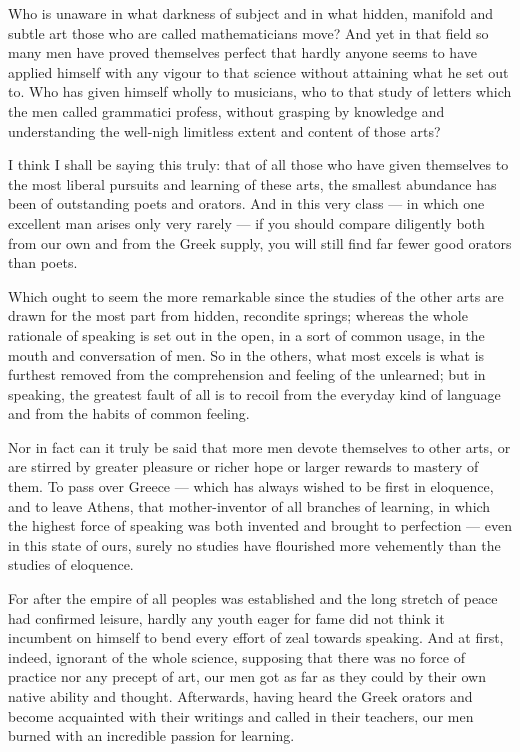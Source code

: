  Who is unaware in what darkness of subject and in what hidden, manifold and subtle art those who are called mathematicians move? And yet in that field so many men have proved themselves perfect that hardly anyone seems to have applied himself with any vigour to that science without attaining what he set out to. Who has given himself wholly to musicians, who to that study of letters which the men called grammatici profess, without grasping by knowledge and understanding the well-nigh limitless extent and content of those arts?

 I think I shall be saying this truly: that of all those who have given themselves to the most liberal pursuits and learning of these arts, the smallest abundance has been of outstanding poets and orators. And in this very class — in which one excellent man arises only very rarely — if you should compare diligently both from our own and from the Greek supply, you will still find far fewer good orators than poets.

 Which ought to seem the more remarkable since the studies of the other arts are drawn for the most part from hidden, recondite springs; whereas the whole rationale of speaking is set out in the open, in a sort of common usage, in the mouth and conversation of men. So in the others, what most excels is what is furthest removed from the comprehension and feeling of the unlearned; but in speaking, the greatest fault of all is to recoil from the everyday kind of language and from the habits of common feeling.

 Nor in fact can it truly be said that more men devote themselves to other arts, or are stirred by greater pleasure or richer hope or larger rewards to mastery of them. To pass over Greece — which has always wished to be first in eloquence, and to leave Athens, that mother-inventor of all branches of learning, in which the highest force of speaking was both invented and brought to perfection — even in this state of ours, surely no studies have flourished more vehemently than the studies of eloquence.

 For after the empire of all peoples was established and the long stretch of peace had confirmed leisure, hardly any youth eager for fame did not think it incumbent on himself to bend every effort of zeal towards speaking. And at first, indeed, ignorant of the whole science, supposing that there was no force of practice nor any precept of art, our men got as far as they could by their own native ability and thought. Afterwards, having heard the Greek orators and become acquainted with their writings and called in their teachers, our men burned with an incredible passion for learning.

